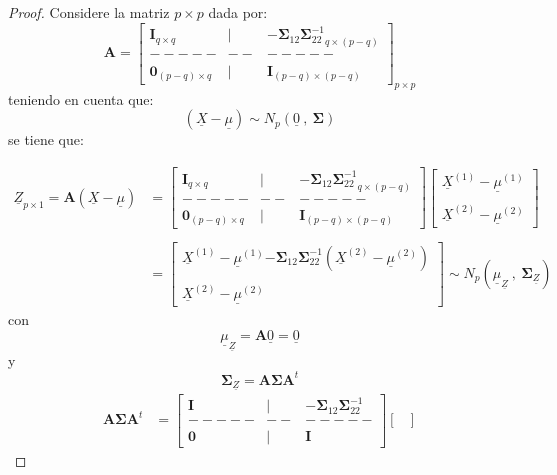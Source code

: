 \documentclass[
]{book}
\theoremstyle{definition}
\theoremstyle{definition}
\theoremstyle{definition}
\theoremstyle{definition}
\theoremstyle{remark}
\begin{document}
\begin{proof}
Considere la matriz \(p\times p\) dada por:
\[
\mathbf{A}=\begin{bmatrix}
\mathbf{I}_{q\times q} & | & {\mathbf{-\Sigma}_{12}\mathbf{\Sigma}_{22}^{-1}}_{q\times (p-q)} \\
----- & -- & ----- \\
\mathbf{0}_{(p-q)\times q} & | & \mathbf{I}_{(p-q)\times (p-q)}
\end{bmatrix}_{p \times p}
\]
teniendo en cuenta que:
\[
(\underline{X}-\underline{\mu})\sim N_p (\underline{0}\ , \ \mathbf{\Sigma}) 
\]
se tiene que:

\begin{align*}
\underline{Z}_{p\times 1}=\mathbf{A}(\underline{X}-\underline{\mu})&=
\begin{bmatrix}
\mathbf{I}_{q\times q} & | & {\mathbf{-\Sigma}_{12}\mathbf{\Sigma}_{22}^{-1}}_{q\times (p-q)} \\
----- & -- & ----- \\
\mathbf{0}_{(p-q)\times q} & | & \mathbf{I}_{(p-q)\times (p-q)}
\end{bmatrix}\begin{bmatrix}
\underline{X}^{(1)}-\underline{\mu}^{(1)} \\ \\ 
\underline{X}^{(2)}-\underline{\mu}^{(2)} 
\end{bmatrix} \\ \\ 
&=\begin{bmatrix}
\underline{X}^{(1)}-\underline{\mu}^{(1)}{\mathbf{-\Sigma}_{12}\mathbf{\Sigma}_{22}^{-1}}\left(\underline{X}^{(2)}-\underline{\mu}^{(2)}\right)\\ \\ 
\underline{X}^{(2)}-\underline{\mu}^{(2)}
\end{bmatrix} \sim N_p (\underline{\mu}_{\underline{Z}} \ , \ \mathbf{\Sigma}_{\underline{Z}})
\end{align*}
con
\[
\underline{\mu}_{\underline{Z}}=\mathbf{A}\underline{0}=\underline{0}
\]
y
\[
\mathbf{\Sigma}_{\underline{Z}}=\mathbf{A}\mathbf{\Sigma}\mathbf{A}^t
\]
\begin{align*}
\mathbf{A}\mathbf{\Sigma}\mathbf{A}^t&=\begin{bmatrix}
\mathbf{I} & | & {\mathbf{-\Sigma}_{12}\mathbf{\Sigma}_{22}^{-1}} \\
----- & -- & ----- \\
\mathbf{0} & | & \mathbf{I}
\end{bmatrix}\begin{bmatrix}

\end{bmatrix}
\end{align*}
\end{proof}
\end{document}

